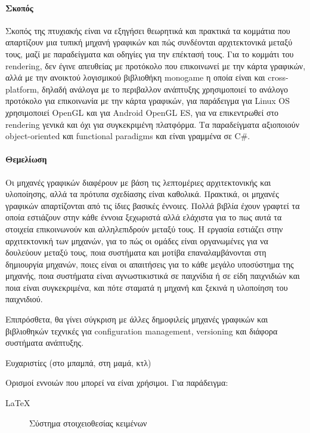 \documentclass[oneside, 12pt]{book}
\begin{document}
	\begin{Preface}
	\paragraph{Σκοπός} 
	Σκοπός της πτυχιακής είναι να εξηγήσει θεωρητικά και πρακτικά τα κομμάτια που απαρτίζουν μια
	τυπική μηχανή γραφικών και πώς συνδέονται αρχιτεκτονικά μεταξύ τους, μαζί με παραδείγματα και οδηγίες για την επέκτασή τους. Για το κομμάτι του rendering, δεν  έγινε απευθείας με προτόκολο που επικοινωνεί με την κάρτα γραφικών, αλλά με την ανοικτού λογισμικού βιβλιοθήκη monogame η οποία είναι και cross-platform,  δηλαδή ανάλογα με το περιβαλλον ανάπτυξης χρησιμοποιεί το ανάλογο προτόκολο για επικοινωνία με την κάρτα γραφικών, για παράδειγμα για Linux OS χρησιμοποιεί OpenGL και για Android ΟpenGL ES, για να επικεντρωθεί στο rendering γενικά και όχι για συγκεκριμένη πλατφόρμα. Τα παραδείγματα αξιοποιούν object-oriented και functional paradigms και είναι γραμμένα σε C\#.

	\paragraph{Θεμελίωση} 	
	Οι μηχανές γραφικών διαφέρουν με βάση τις λεπτομέριες αρχιτεκτονικής και υλοποίησης, αλλά τα πρότυπα σχεδίασης είναι καθολικά. Πρακτικά, οι μηχανές γραφικών απαρτίζονται από τις ίδιες βασικές έννοιες. Πολλά βιβλία έχουν γραφτεί τα οποία εστιάζουν στην κάθε έννοια ξεχωριστά αλλά ελάχιστα για το πως αυτά τα στοιχεία επικοινωνούν και αλληλεπιδρούν μεταξύ τους. 
	Η εργασία εστιάζει στην αρχιτεκτονική των μηχανών, 
	για το πώς οι ομάδες είναι οργανωμένες για να δουλεύουν μεταξύ τους, 
	ποια συστήματα και μοτίβα επαναλαμβάνονται στη δημιουργία μηχανών, 
	ποιες είναι οι απαιτήσεις για το κάθε μεγάλο υποσύστημα της μηχανής, 
	ποια συστήματα είναι αγνωστικιστικά σε παιχνίδια ή σε είδη παιχνιδιών και ποια είναι συγκεκριμένα,
	και πότε σταματά η μηχανή και ξεκινά η υλοποίηση του παιχνιδιού.
	
	Eπιπρόσθετα, θα γίνει σύγκριση με άλλες δημοφιλείς μηχανές γραφικών και βιβλιοθηκών τεχνικές για configuration management, versioning και διάφορα συστήματα ανάπτυξης. 
	\end{Preface}
	
	\begin{Acknowledgement}
		Ευχαριστίες (στο μπαμπά, στη μαμά, κτλ)
	\end{Acknowledgement}
	
	\begin{Definitions}
		Ορισμοί εννοιών που μπορεί να είναι χρήσιμοι. Για παράδειγμα:	
		\begin{description}
			\item [\LaTeX] Σύστημα στοιχειοθεσίας κειμένων
		\end{description}
		
	\end{Definitions}
	
\end{document}
